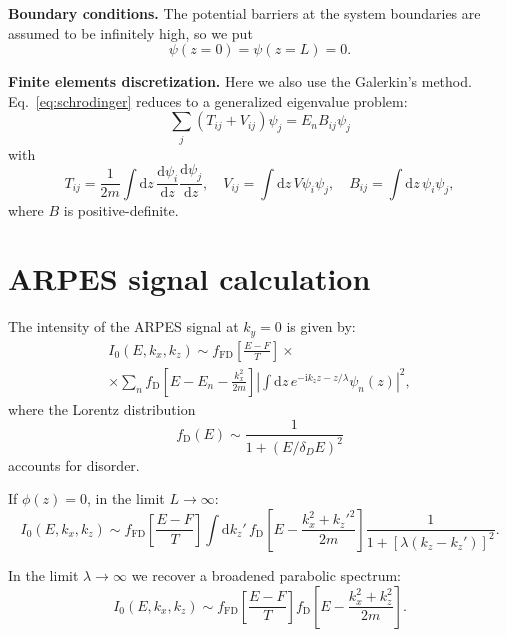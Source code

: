 \documentclass[10pt]{article}
\newcommand{\dd}{\mathrm{d}}
\newcommand{\ii}{\mathrm{i}}
\begin{document}
\textbf{Boundary conditions.} The potential barriers at the system
boundaries are assumed to be infinitely high, so we put
\begin{equation}
	\psi(z = 0) = \psi(z = L) = 0.
\end{equation}

\textbf{Finite elements discretization.} Here we also use the Galerkin's
method. Eq.~\eqref{eq:schrodinger} reduces to a generalized eigenvalue problem:
\begin{equation}
	\sum_j \left( T_{ij} + V_{ij} \right) \psi_j = E_n B_{ij} \psi_j
\end{equation}
with
\begin{equation}
	T_{ij} = \frac{1}{2m }\int \dd z \, \frac{\dd \psi_i}{\dd z}
		\frac{\dd \psi_j}{\dd z}, \quad
	V_{ij} = \int \dd z \, V \psi_i \psi_j, \quad
	B_{ij} = \int \dd z \,\psi_i \psi_j,
\end{equation}
where $B$ is positive-definite.

\section{ARPES signal calculation}

The intensity of the ARPES signal at $k_y = 0$ is given by:
\begin{multline}
	I_0(E, k_x, k_z) \sim f_{\mathrm{FD}}\left[ \frac{E - F}{T} \right] \times\\
		\times \sum_n f_{\mathrm{D}}\left[ E - E_n - \frac{k_x^2}{2m} \right]
		\left\vert \int \dd z \, e^{-\ii k_z z - z / \lambda}
		\psi_n(z) \right\vert^2,
\end{multline}
where the Lorentz distribution
\begin{equation}
	f_{\mathrm{D}}(E) \sim \frac{1}{1 + (E / \delta_D E)^2}
\end{equation}
accounts for disorder.

If $\phi(z) = 0$, in the limit $L \to \infty$:
\begin{equation}
	I_0(E, k_x, k_z) \sim f_{\mathrm{FD}}\left[ \frac{E - F}{T} \right]
		\int \dd k_z' \, f_{\mathrm{D}}\left[ E - \frac{k_x^2 + k_z'^2}{2m} \right]
		\frac{1}{1 + [\lambda (k_z - k_z')]^2}.
\end{equation}

In the limit $\lambda \to \infty$ we recover a broadened parabolic spectrum:
\begin{equation}
	I_0(E, k_x, k_z) \sim f_{\mathrm{FD}}\left[ \frac{E - F}{T} \right]
		f_{\mathrm{D}}\left[ E - \frac{k_x^2 + k_z^2}{2m} \right].
\end{equation}
\end{document}
